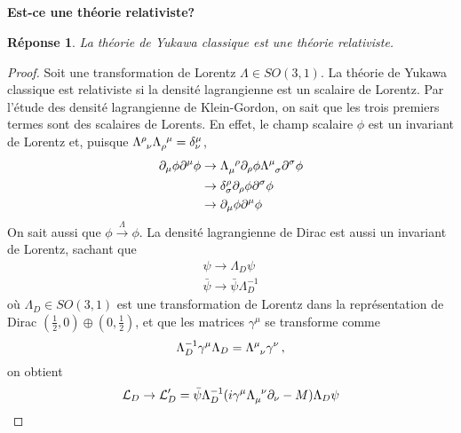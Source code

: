 \documentclass{article}
\numberwithin{equation}{section}
\theoremstyle{solution}
\newtheorem{solution}{Réponse}[section]
\begin{document}
\subsection{}
\textbf{Est-ce une théorie relativiste?}\\
\begin{solution}
       La théorie de Yukawa classique est une théorie relativiste. 
\end{solution}
\begin{proof}
Soit une transformation de Lorentz $\Lambda \in SO(3, 1)$. La théorie de Yukawa classique est relativiste si 
la densité lagrangienne est un scalaire de Lorentz. Par l'étude des densité lagrangienne de Klein-Gordon,  
on sait que les trois premiers termes sont des scalaires de Lorents. En effet, le champ scalaire $\phi$ est un invariant de Lorentz 
et, puisque $\Lambda\indices{^{\rho}_{\nu}}\Lambda\indices{_{\rho}^{\mu}} = \delta^{\mu}_\nu$, 
\begin{align*}
       \partial_\mu \phi \partial^{\mu}\phi &\rightarrow \Lambda\indices{_{\mu}^{\rho}}\partial_\rho \phi \Lambda\indices{^{\mu}_{\sigma}}\partial^{\sigma}\phi \\
                &\rightarrow  \delta^{\rho}_\sigma \partial_\rho \phi\partial^{\sigma}\phi \\
                &\rightarrow  \partial_\mu \phi \partial^{\mu}\phi  \\
\end{align*} 
On sait aussi que $\phi \overset{\Lambda}{\rightarrow}  \phi$.
La densité lagrangienne de Dirac est aussi un invariant de Lorentz, sachant que 
\begin{equation}
        \begin{split}
                \psi \rightarrow \Lambda_D \psi \\
                \bar{\psi} \rightarrow \bar{\psi}\Lambda_D^{-1}
        \end{split}
\end{equation} 
où $\Lambda_D \in SO(3, 1)$ est une transformation de Lorentz dans la représentation de Dirac $(\frac{1}{2}, 0) \oplus (0, \frac{1}{2})$, 
et que les matrices $\gamma^{\mu}$ se transforme comme
\begin{equation}
        \Lambda_D^{-1} \gamma^{\mu} \Lambda_D = \Lambda\indices{^{\mu}_{\nu}}\gamma^{\nu}\, ,
\end{equation} 
on obtient 
\begin{align*}
       \mathcal{L}_D \rightarrow \mathcal{L}'_D &= \bar{\psi}\Lambda_D^{-1}(i\gamma^{\mu} \Lambda\indices{_{\mu}^{\nu}}\partial_\nu - M)\Lambda_D \psi \\

\end{align*}
\end{proof}
\end{document}
